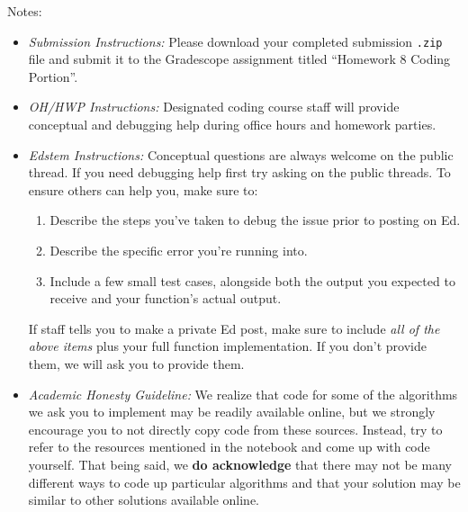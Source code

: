 \documentclass[11pt]{article}
\begin{document}
\noindent Notes:
\begin{itemize}
    \item \textit{Submission Instructions:} Please download your completed submission \texttt{.zip} file and submit it to the Gradescope assignment titled ``Homework 8  Coding Portion''.
        
    \item \textit{OH/HWP Instructions:} Designated coding course staff will provide conceptual and debugging help during office hours and homework parties.

    \item \textit{Edstem Instructions:} Conceptual questions are always welcome on the public thread. If you need debugging help first try asking on the public threads. To ensure others can help you, make sure to:
        \begin{enumerate}
            \item Describe the steps you've taken to debug the issue prior to posting on Ed.
            \item Describe the specific error you're running into.
            \item Include a few small test cases, alongside both the output you expected to receive and your function's actual output. 
        \end{enumerate}
    If staff tells you to make a private Ed post, make sure to include \textit{all of the above items} plus your full function implementation. If you don't provide them, we will ask you to provide them.
    
    \item \textit{Academic Honesty Guideline:} We realize that code for some of the algorithms we ask you to implement may be readily available online, but we strongly encourage you to not directly copy code from these sources. Instead, try to refer to the resources mentioned in the notebook and come up with code yourself. That being said, we \textbf{do acknowledge} that there may not be many different ways to code up particular algorithms and that your solution may be similar to other solutions available online.
    
\end{itemize}
\end{document}
